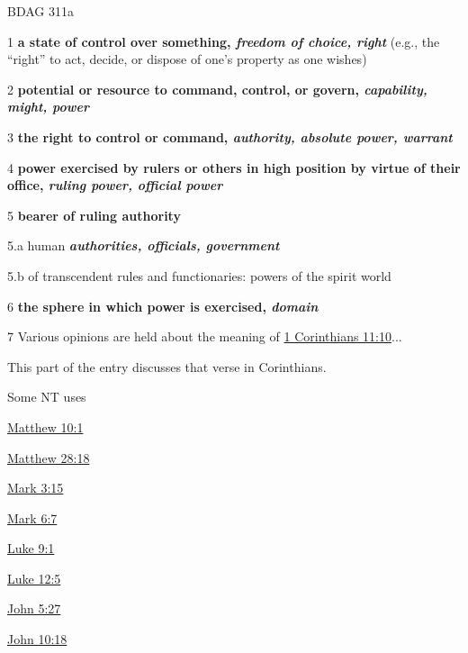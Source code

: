 				\begin{compactdesc}
					\item[BDAG 311a] \textbf{}
						\begin{compactitem}
							\item[1] \textbf{a state of control over something, \textit{freedom of choice, right}} (e.g., the ``right'' to act, decide, or dispose of one's property as one wishes)
							\item[2] \textbf{potential or resource to command, control, or govern, \textit{capability, might, power}}
							\item[3] \textbf{the right to control or command, \textit{authority, absolute power, warrant}}
							\item[4] \textbf{power exercised by rulers or others in high position by virtue of their office, \textit{ruling power, official power}}
							\item[5] \textbf{bearer of ruling authority}
							\item[5.a] human \textbf{\textit{authorities, officials, government}}
							\item[5.b] of transcendent rules and functionaries: powers of the spirit world
							\item[6] \textbf{the sphere in which power is exercised, \textit{domain}}
							\item[7] Various opinions are held about the meaning of \hyperref[1CORINTHIANS-11-10]{1 Corinthians 11:10}...
								\begin{compactitem}
									\item This part of the entry discusses that verse in Corinthians.
								\end{compactitem}
						\end{compactitem}
				\end{compactdesc}
				
				\begin{compactdesc}
					\item[Some NT uses] \textbf{}
						\begin{compactdesc}
							\item[{\hyperref[MATTHEW-10-1]{Matthew 10:1}}]
							\item[{\hyperref[MATTHEW-28-18]{Matthew 28:18}}]
							\item[{\hyperref[MARK-3-15]{Mark 3:15}}]
							\item[{\hyperref[MARK-6-7]{Mark 6:7}}]
							\item[{\hyperref[LUKE-9-1]{Luke 9:1}}]
							\item[{\hyperref[LUKE-12-5]{Luke 12:5}}]
							\item[{\hyperref[JOHN-5-27]{John 5:27}}]
							\item[{\hyperref[JOHN-10-18]{John 10:18}}]
						\end{compactdesc}
				\end{compactdesc}
		
